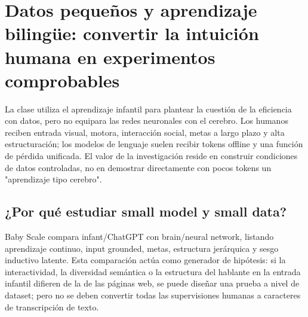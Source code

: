\section{Datos pequeños y aprendizaje bilingüe: convertir la intuición humana en experimentos comprobables}

La clase utiliza el aprendizaje infantil para plantear la cuestión de la eficiencia con datos, pero no equipara las redes neuronales con el cerebro. Los humanos reciben entrada visual, motora, interacción social, metas a largo plazo y alta estructuración; los modelos de lenguaje suelen recibir tokens offline y una función de pérdida unificada. El valor de la investigación reside en construir condiciones de datos controladas, no en demostrar directamente con pocos tokens un "aprendizaje tipo cerebro".

\subsection{¿Por qué estudiar small model y small data?}

Baby Scale compara infant/ChatGPT con brain/neural network, listando aprendizaje continuo, input grounded, metas, estructura jerárquica y sesgo inductivo latente. Esta comparación actúa como generador de hipótesis: si la interactividad, la diversidad semántica o la estructura del hablante en la entrada infantil difieren de la de las páginas web, se puede diseñar una prueba a nivel de dataset; pero no se deben convertir todas las supervisiones humanas a caracteres de transcripción de texto.





